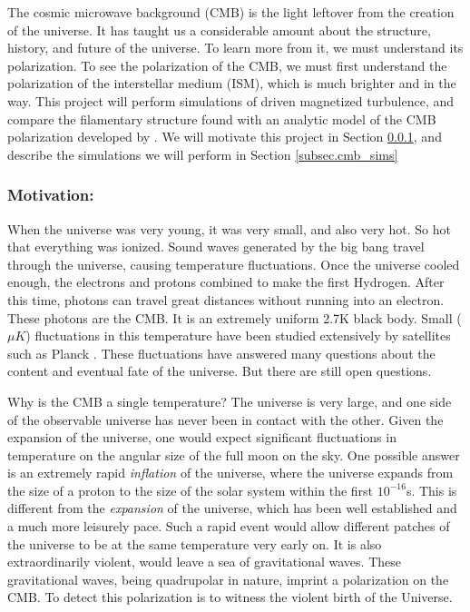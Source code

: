 The cosmic microwave background (CMB) is the light leftover from the creation of
the universe.  It has taught us a considerable amount about the structure,
history, and future of the
universe.  To learn more from it, we must understand its polarization.  To see
the polarization of the CMB, we must first understand the polarization of the
interstellar medium (ISM), which is much brighter and in the way.  This project
will perform simulations of driven magnetized turbulence, and compare the
filamentary structure found with an analytic model of the CMB polarization
developed by \citet{Huffenberger20}.  We will
motivate this project in Section \ref{subsec.cmb_motivate}, and describe the
simulations we will perform in Section \ref{subsec.cmb_sims}

\subsubsection{Motivation: \nameCMB}
\label{subsec.cmb_motivate}

When the universe was very young, it was very small, and also very hot.  So hot
that everything was ionized.  Sound waves generated by the big bang travel through
the universe, causing temperature fluctuations.  Once the universe cooled
enough, the electrons and protons combined to make the first Hydrogen.  After
this time, photons can travel great distances without running into an electron.
These photons are the CMB.  It is an extremely uniform 2.7K black body.  Small
($\mu K$) fluctuations in this temperature have been studied extensively by
satellites such as Planck \citep{Planck2018VI20}. These fluctuations have answered many
questions about the content and eventual fate of the universe.  But there are
still open questions.

Why is the CMB a single temperature?  The
universe is very large, and one side of the observable universe has never been
in contact with the other.  Given the expansion of the universe, one would
expect significant fluctuations in temperature on the angular size of the full moon on the sky.
One possible answer is an extremely rapid
\emph{inflation} of the universe, where the universe expands from the size of a
proton to the size of the solar system within the first $10^{-16}$s.  This is
different from the \emph{expansion} of the universe, which has been well
established and a much more leisurely pace.  Such a
rapid event would allow different patches of the universe to be at the same
temperature very early on.  
It is also extraordinarily violent, would leave a sea of gravitational waves.  These gravitational
waves, being quadrupolar in nature, imprint a polarization on the CMB. To detect
this polarization is to witness the violent birth of the Universe.

